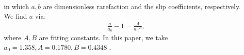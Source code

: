 in which $a, b$ are dimensionless rarefaction and the slip coefficients, respectively. We find $a$ via:
\begin{equation*}
\begin{aligned}
\frac{a}{a_0}-1=\frac{A}{{\kappa_n}^B},
\end{aligned}
\end{equation*}
where $A, B$ are fitting constants. In this paper, we take $a_0=1.358, A=0.1780, B=0.4348$ \cite{Civan2010}.

